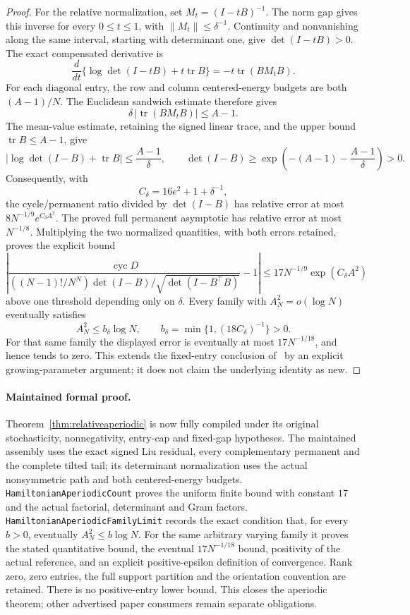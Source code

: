 \begin{proof}
For the relative normalization, set \(M_t=(I-tB)^{-1}\).
The norm gap gives this inverse for every \(0\leq t\leq1\),
with \(\|M_t\|\leq\delta^{-1}\).
Continuity and nonvanishing along the same interval, starting
with determinant one, give \(\det(I-tB)>0\).
The exact compensated derivative is
\[
 \frac{d}{dt}\{\log\det(I-tB)+t\operatorname{tr}B\}
       =-t\operatorname{tr}(BM_tB).
\]
For each diagonal entry, the row and column centered-energy
budgets are both \((A-1)/N\). The Euclidean sandwich estimate
therefore gives
\[
 \delta\,|\operatorname{tr}(BM_tB)|\leq A-1.
\]
The mean-value estimate, retaining the signed linear trace,
and the upper bound \(\operatorname{tr}B\leq A-1\), give
\[
 |\log\det(I-B)+\operatorname{tr}B|\leq\frac{A-1}{\delta},
 \qquad
 \det(I-B)\geq
       \exp\left(-(A-1)-\frac{A-1}{\delta}\right)>0.
\]
Consequently, with
\[
 C_\delta=16e^2+1+\delta^{-1},
\]
the cycle/permanent ratio divided by \(\det(I-B)\) has
relative error at most \(8N^{-1/9}e^{C_\delta A^2}\).
The proved full permanent asymptotic has relative error
at most \(N^{-1/8}\). Multiplying the two normalized quantities,
with both errors retained, proves the explicit bound
\[
 \left|
 \frac{\operatorname{cyc}D}
 {((N-1)!/N^N)\det(I-B)/\sqrt{\det(I-B^\top B)}}-1
 \right|
 \leq17N^{-1/9}\exp(C_\delta A^2)
\]
above one threshold depending only on \(\delta\).
Every family with \(A_N^2=o(\log N)\) eventually satisfies
\[
 A_N^2\leq b_\delta\log N,\qquad
 b_\delta=\min\{1,(18C_\delta)^{-1}\}>0.
\]
For that same family the displayed error is eventually at most
\(17N^{-1/18}\), and hence tends to zero.
This extends the fixed-entry conclusion
of~\cite[Proposition 5.1]{DW} by an explicit growing-parameter
argument; it does not claim the underlying identity as new.
\end{proof}

\paragraph{Maintained formal proof.}
Theorem~\ref{thm:relativeaperiodic} is now fully compiled
under its original stochasticity, nonnegativity, entry-cap and
fixed-gap hypotheses. The maintained assembly uses the exact
signed Liu residual, every complementary permanent and the
complete tilted tail; its determinant normalization uses the
actual nonsymmetric path and both centered-energy budgets.
\texttt{HamiltonianAperiodicCount} proves the uniform finite
bound with constant \(17\) and the actual factorial,
determinant and Gram factors.
\texttt{HamiltonianAperiodicFamilyLimit} records the exact
condition that, for every \(b>0\), eventually
\(A_N^2\leq b\log N\). For the same arbitrary varying family it
proves the stated quantitative bound, the eventual
\(17N^{-1/18}\) bound, positivity of the actual reference,
and an explicit positive-epsilon definition of convergence.
Rank zero, zero entries, the full support partition and the
orientation convention are retained. There is no positive-entry
lower bound. This closes the aperiodic theorem; other advertised
paper consumers remain separate obligations.


